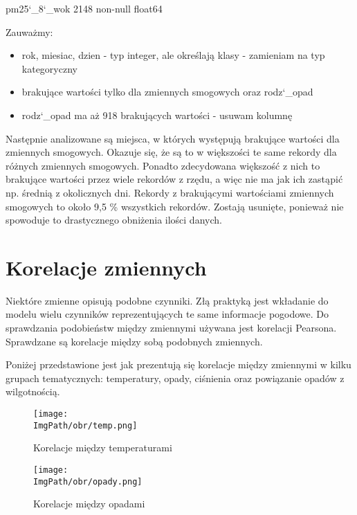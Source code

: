 \documentclass[a4paper,12pt,twoside,openany]{report}
\newcommand{\ImgPath}{.}
\begin{document}
pm25\char`_8\char`_wok        2148 non-null float64

Zauważmy:
\begin{itemize}
	\item rok, miesiac, dzien - typ integer, ale określają klasy - zamieniam na typ kategoryczny
	\item brakujące wartości tylko dla zmiennych smogowych oraz rodz\char`_opad
	\item rodz\char`_opad ma aż 918 brakujących wartości - usuwam kolumnę
\end{itemize}

Następnie analizowane są miejsca, w których występują brakujące wartości dla zmiennych smogowych. Okazuje się, że są to w większości te same rekordy dla różnych zmiennych smogowych. Ponadto zdecydowana większość z nich to brakujące wartości przez wiele rekordów z rzędu, a więc nie ma jak ich zastąpić np. średnią z okolicznych dni. Rekordy z brakującymi wartościami zmiennych smogowych to około 9,5 \% wszystkich rekordów. Zostają usunięte, ponieważ nie spowoduje to drastycznego obniżenia ilości danych.

\section{Korelacje zmiennych}

Niektóre zmienne opisują podobne czynniki. Złą praktyką jest wkładanie do modelu wielu czynników reprezentujących te same informacje pogodowe. Do sprawdzania podobieństw między zmiennymi używana jest korelacji Pearsona. Sprawdzane są korelacje między sobą podobnych zmiennych.

Poniżej przedstawione jest jak prezentują się korelacje między zmiennymi w kilku grupach tematycznych: temperatury, opady, ciśnienia oraz powiązanie opadów z wilgotnością.

\begin{figure}[H]
	\begin{center}
		\centering
		\texttt{[image: \\ImgPath/obr/temp.png]}
	\end{center}
	\caption{Korelacje między temperaturami}
	\label{kortemp}
\end{figure}

\begin{figure}[H]
	\begin{center}
		\centering
		\texttt{[image: \\ImgPath/obr/opady.png]}
	\end{center}
	\caption{Korelacje między opadami}
	\label{korop}
\end{figure}
\end{document}
